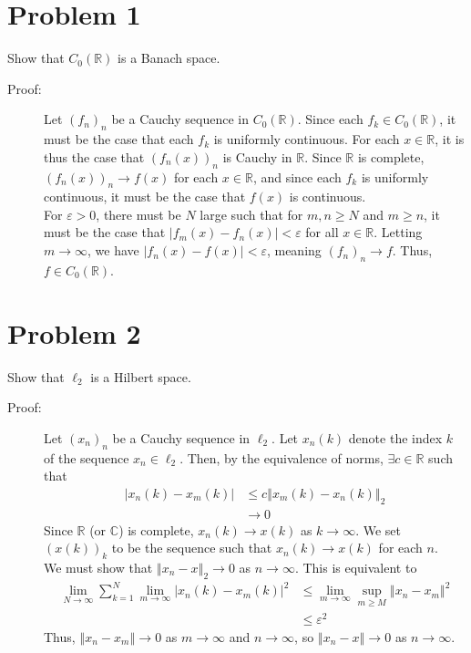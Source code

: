 \documentclass[8pt]{extarticle}
\title{}
\author{}
\date{}
\newcommand{\R}{\mathbb{R}}
\newcommand{\C}{\mathbb{C}}
\newcommand{\norm}[1]{\left\Vert #1\right\Vert}
\begin{document}
  \section{Problem 1}%
  Show that $C_0(\R)$ is a Banach space.
  \begin{description}
    \item[Proof:] Let $(f_n)_n$ be a Cauchy sequence in $C_0(\R)$. Since each $f_k\in C_0(\R)$, it must be the case that each $f_k$ is uniformly continuous. For each $x\in \R$, it is thus the case that $(f_n(x))_n$ is Cauchy in $\R$. Since $\R$ is complete, $(f_n(x))_n\rightarrow f(x)$ for each $x\in \R$, and since each $f_k$ is uniformly continuous, it must be the case that $f(x)$ is continuous.\\

      For $\varepsilon > 0$, there must be $N$ large such that for $m,n\geq N$ and $m\geq n$, it must be the case that $|f_m(x)-f_n(x)| < \varepsilon$ for all $x\in \R$. Letting $m\rightarrow\infty$, we have $|f_n(x)-f(x)| < \varepsilon$, meaning $(f_n)_n\rightarrow f$. Thus, $f\in C_0(\R)$.
  \end{description}
  \section{Problem 2}%
  Show that $\ell_2$ is a Hilbert space.
  \begin{description}
    \item[Proof:] Let $(x_n)_n$ be a Cauchy sequence in $\ell_2$. Let $x_n(k)$ denote the index $k$ of the sequence $x_n\in \ell_2$. Then, by the equivalence of norms, $\exists c\in \R$ such that
      \begin{align*}
        |x_n(k) - x_m(k)| &\leq c\norm{x_m(k) - x_n(k)}_2\\
                          &\rightarrow 0 \tag*{since $(x_n)_n$ is Cauchy in $\ell_2$.}
      \end{align*}
      Since $\R$ (or $\C$) is complete, $x_n(k) \rightarrow x(k)$ as $k\rightarrow \infty$. We set $(x(k))_k$ to be the sequence such that $x_n(k) \rightarrow x(k)$ for each $n$.\\

      We must show that $\norm{x_n - x}_2\rightarrow 0$ as $n\rightarrow \infty$. This is equivalent to
      \begin{align*}
        \lim_{N\rightarrow\infty}\sum_{k=1}^{N}\lim_{m\rightarrow\infty}|x_n(k) - x_m(k)|^2 &\leq \lim_{m\rightarrow\infty}\sup_{m\geq M}\norm{x_n - x_m}^2\\
                                                                                            &\leq \varepsilon^2 \tag*{since $(x_n)_n$ is Cauchy.}
      \end{align*}
      Thus, $\norm{x_n-x_m} \rightarrow 0$ as $m\rightarrow \infty$ and $n\rightarrow\infty$, so $\norm{x_n - x}\rightarrow 0$ as $n\rightarrow\infty$.
  \end{description}
\end{document}

